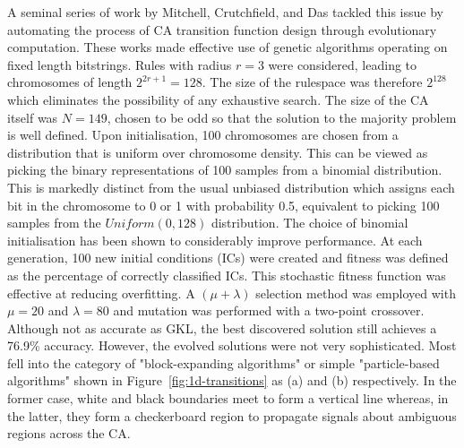 A seminal series of work by Mitchell, Crutchfield, and Das\cite{mitchell1996evolving} tackled this issue by automating the process of CA transition function design through evolutionary computation. These works made effective use of genetic algorithms operating on fixed length bitstrings. Rules with radius $r = 3$ were considered, leading to chromosomes of length $2^{2r+1}=128$. The size of the rulespace was therefore $2^{128}$ which eliminates the possibility of any exhaustive search. The size of the CA itself was $N=149$, chosen to be odd so that the solution to the majority problem is well defined. Upon initialisation, 100 chromosomes are chosen from a distribution that is uniform over chromosome density. This can be viewed as picking the binary representations of 100 samples from a binomial distribution. This is markedly distinct from the usual unbiased distribution which assigns each bit in the chromosome to 0 or 1 with probability 0.5, equivalent to picking 100 samples from the $Uniform(0, 128)$ distribution. The choice of binomial initialisation has been shown to considerably improve performance\cite{mitchell1994evolving}. At each generation, 100 new initial conditions (ICs) were created and fitness was defined as the percentage of correctly classified ICs. This stochastic fitness function was effective at reducing overfitting. A $(\mu+\lambda)$ selection method was employed with $\mu=20$ and $\lambda=80$ and mutation was performed with a two-point crossover. Although not as accurate as GKL, the best discovered solution still achieves a 76.9\% accuracy. However, the evolved solutions were not very sophisticated. Most fell into the category of "block-expanding algorithms" or simple "particle-based algorithms" shown in Figure~\ref{fig:1d-transitions} as (a) and (b) respectively. In the former case, white and black boundaries meet to form a vertical line whereas, in the latter, they form a checkerboard region to propagate signals about ambiguous regions across the CA.\\

